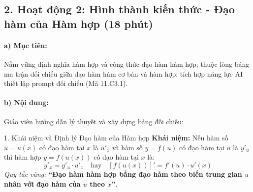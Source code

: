 \documentclass[12pt, a4paper]{article}
\begin{document}
\subsection*{2. Hoạt động 2: Hình thành kiến thức - Đạo hàm của Hàm hợp (18 phút)}

\paragraph{a) Mục tiêu:} Nắm vững định nghĩa hàm hợp và công thức đạo hàm hàm hợp; thuộc lòng bảng ma trận đối chiếu giữa đạo hàm hàm cơ bản và hàm hợp; tích hợp năng lực AI thiết lập prompt đối chiếu (Mã 11.C3.1).

\paragraph{b) Nội dung:} Giáo viên hướng dẫn lý thuyết và xây dựng bảng đối chiếu:

\begin{pedabox}{1. Khái niệm và Định lý Đạo hàm của Hàm hợp}
\textbf{Khái niệm:} Nếu hàm số $u = u(x)$ có đạo hàm tại $x$ là $u'_x$ và hàm số $y = f(u)$ có đạo hàm tại $u$ là $y'_u$ thì hàm hợp $y = f(u(x))$ có đạo hàm tại $x$ là:
\begin{equation}
    y'_x = y'_u \cdot u'_x \quad \text{hay} \quad \left[ f(u(x)) \right]' = f'(u) \cdot u'(x)
\end{equation}
\textit{Quy tắc vàng:} \textbf{``Đạo hàm hàm hợp bằng đạo hàm theo biến trung gian $u$ nhân với đạo hàm của $u$ theo $x$''}.
\end{pedabox}
\end{document}
